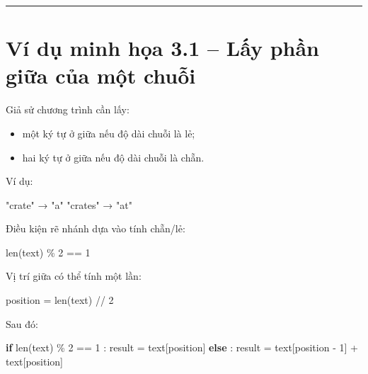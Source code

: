 \documentclass[
  11pt,
  a4paper,
]{article}
\newenvironment{Shaded}{}{}
\newcommand{\BuiltInTok}[1]{\textcolor[rgb]{0.00,0.50,0.00}{#1}}
\newcommand{\ControlFlowTok}[1]{\textcolor[rgb]{0.00,0.44,0.13}{\textbf{#1}}}
\newcommand{\DecValTok}[1]{\textcolor[rgb]{0.25,0.63,0.44}{#1}}
\newcommand{\NormalTok}[1]{#1}
\newcommand{\OperatorTok}[1]{\textcolor[rgb]{0.40,0.40,0.40}{#1}}
\providecommand{\tightlist}{%
  \setlength{\itemsep}{0pt}\setlength{\parskip}{0pt}}
\begin{document}
\begin{center}\rule{0.5\linewidth}{0.5pt}\end{center}

\section{Ví dụ minh họa 3.1 -- Lấy phần giữa của một
chuỗi}\label{vuxed-dux1ee5-minh-hux1ecda-3.1-lux1ea5y-phux1ea7n-giux1eefa-cux1ee7a-mux1ed9t-chuux1ed7i}

Giả sử chương trình cần lấy:

\begin{itemize}
\tightlist
\item
  một ký tự ở giữa nếu độ dài chuỗi là lẻ;
\item
  hai ký tự ở giữa nếu độ dài chuỗi là chẵn.
\end{itemize}

Ví dụ:

\begin{Shaded}
\begin{Highlighting}[]
\NormalTok{"crate"   → "a"}
\NormalTok{"crates"  → "at"}
\end{Highlighting}
\end{Shaded}

Điều kiện rẽ nhánh dựa vào tính chẵn/lẻ:

\begin{Shaded}
\begin{Highlighting}[]
\BuiltInTok{len}\NormalTok{(text) }\OperatorTok{\%} \DecValTok{2} \OperatorTok{==} \DecValTok{1}
\end{Highlighting}
\end{Shaded}

Vị trí giữa có thể tính một lần:

\begin{Shaded}
\begin{Highlighting}[]
\NormalTok{position }\OperatorTok{=} \BuiltInTok{len}\NormalTok{(text) }\OperatorTok{//} \DecValTok{2}
\end{Highlighting}
\end{Shaded}

Sau đó:

\begin{Shaded}
\begin{Highlighting}[]
\ControlFlowTok{if} \BuiltInTok{len}\NormalTok{(text) }\OperatorTok{\%} \DecValTok{2} \OperatorTok{==} \DecValTok{1}\NormalTok{ :}
\NormalTok{    result }\OperatorTok{=}\NormalTok{ text[position]}
\ControlFlowTok{else}\NormalTok{ :}
\NormalTok{    result }\OperatorTok{=}\NormalTok{ text[position }\OperatorTok{{-}} \DecValTok{1}\NormalTok{] }\OperatorTok{+}\NormalTok{ text[position]}
\end{Highlighting}
\end{Shaded}
\end{document}
